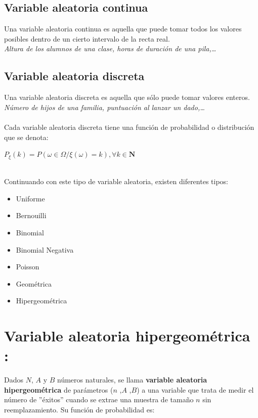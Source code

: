\documentclass[spanish,a4paper,12pt]{report}
\begin{document}
\subsection{Variable aleatoria continua}
Una variable aleatoria continua es aquella que puede tomar todos los valores posibles dentro de un cierto intervalo de la recta real. \\

{\textit{Altura de los alumnos de una clase, horas de duración de una pila,…}}

\subsection{Variable aleatoria discreta}


Una variable aleatoria discreta es aquella que sólo puede tomar valores enteros. 
\ \\

{\textit{Número de hijos de una familia, puntuación al lanzar un dado,…}}\\
\ \\
Cada variable aleatoria discreta tiene una función de probabilidad o distribución que se denota:\\
 
\centerline{$P_\xi (k) = P({\omega \in \Omega / \xi(\omega) = k}) , \forall k \in \mathbf{N}$}
\ \\
Continuando con este tipo de variable aleatoria, existen diferentes tipos:
\ \\
\begin{itemize}
\item Uniforme
\item Bernouilli
\item Binomial
\item Binomial Negativa
\item Poisson
\item Geométrica
\item Hipergeométrica
\end{itemize}

\section{Variable aleatoria hipergeométrica :}
Dados $N$, $A$ y $B$  números naturales, se llama {\textbf{variable aleatoria hipergeométrica}} de parámetros ($n$ ,$A$ ,$B$) a una variable que trata de medir el número de ''éxitos'' cuando se extrae una muestra de tamaño $n$ sin reemplazamiento. Su función de probabilidad es:\\
\end{document}
